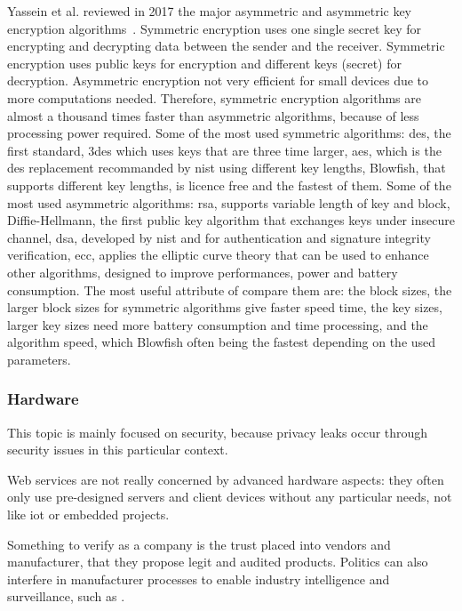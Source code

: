 Yassein et al. reviewed in 2017 the major asymmetric and asymmetric key encryption algorithms~\cite{yassein_comprehensive_2017}. Symmetric encryption uses one single secret key for encrypting and decrypting data between the sender and the receiver. Symmetric encryption uses public keys for encryption and different keys (secret) for decryption. Asymmetric encryption not very efficient for small devices due to more computations needed. Therefore, symmetric encryption algorithms are almost a thousand times faster than asymmetric algorithms, because of less processing power required. Some of the most used symmetric algorithms: \gls{des}, the first standard, 3\gls{des} which uses keys that are three time larger, \gls{aes}, which is the \gls{des} replacement recommanded by \gls{nist} using different key lengths, Blowfish, that supports different key lengths, is licence free and the fastest of them. Some of the most used asymmetric algorithms: \gls{rsa}, supports variable length of key and block, Diffie-Hellmann, the first public key algorithm that exchanges keys under insecure channel, \gls{dsa}, developed by \gls{nist} and for authentication and signature integrity verification, \gls{ecc}, applies the elliptic curve theory that can be used to enhance other algorithms, designed to improve performances, power and battery consumption. The most useful attribute of compare them are: the block sizes, the larger block sizes for symmetric algorithms give faster speed time, the key sizes, larger key sizes need more battery consumption and time processing, and the algorithm speed, which Blowfish often being the fastest depending on the used parameters. %

\subsubsection{Hardware}
\label{subsubsec:state_review_results_hardware}

This topic is mainly focused on security, because privacy leaks occur through security issues in this particular context.

Web services are not really concerned by advanced hardware aspects: they often only use pre-designed servers and client devices without any particular needs, not like \gls{iot} or embedded projects. 

Something to verify as a company is the trust placed into vendors and manufacturer, that they propose legit and audited products. Politics can also interfere in manufacturer processes to enable industry intelligence and surveillance, such as .


